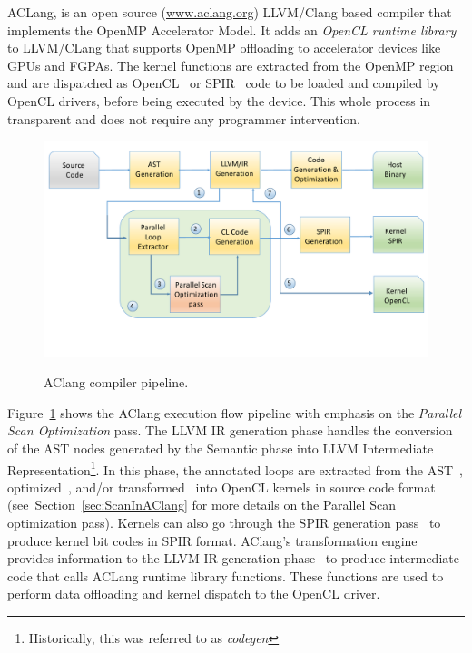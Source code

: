 \documentclass[Ingles]{ic-tese-v1}
\newcommand{\rsec}[1]{Section~\ref{sec:#1}}
\newcommand{\rfig}[1]{Figure~\ref{fig:#1}}
\begin{document}
ACLang,  is an  open  source (\url{www.aclang.org})  LLVM/Clang
based compiler that implements the  OpenMP Accelerator Model.  It adds
an {\em  OpenCL runtime  library} to  LLVM/CLang that  supports OpenMP
offloading to  accelerator devices  like GPUs  and FGPAs.   The kernel
functions are extracted  from the OpenMP region and  are dispatched as
OpenCL~\cite{opencl}  or  SPIR~\cite{spir}  code   to  be  loaded  and
compiled by OpenCL  drivers, before being executed by  the device. This
whole  process in  transparent  and does  not  require any  programmer
intervention.

\begin{figure}[t]
	\caption{AClang compiler pipeline.}
	\centering
	\includegraphics[scale=0.25]{images/aclang_scan.pdf}
	\label{fig:aclang}
\end{figure}


\rfig{aclang} shows  the AClang execution flow  pipeline with
emphasis on the \textit{Parallel Scan Optimization} pass.  The
LLVM IR generation phase handles the conversion of the AST
nodes  generated   by  the  Semantic  phase   into  LLVM  Intermediate
Representation\footnote{Historically,   this  was   referred  to   as
	\textit{codegen}}.  In this phase, the annotated loops are extracted
from     the      AST~,     optimized~,     and/or
transformed~  into  OpenCL  kernels in  source  code  format~ 
(see~\rsec{ScanInAClang}   for  more   details   on  the   Parallel Scan
optimization pass).   Kernels can also go  through the SPIR
generation pass~ to produce kernel bit codes in SPIR format.
AClang's  transformation engine~  provides information
to  the LLVM  IR generation  phase~ to  produce intermediate
code  that  calls  ACLang   runtime  library  functions.   These
functions are used  to perform data offloading and  kernel dispatch to
the  OpenCL  driver. 
\end{document}
